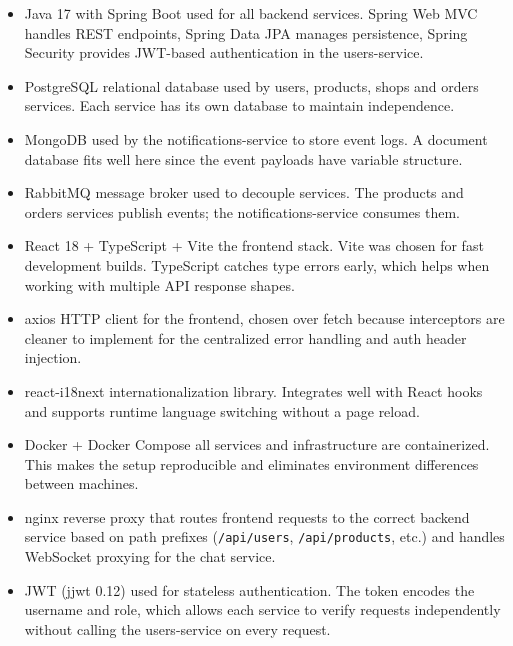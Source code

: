 \documentclass[12pt, a4paper]{article}
\begin{document}
\begin{itemize}
    \item Java 17 with Spring Boot  used for all backend services. Spring Web MVC handles
    REST endpoints, Spring Data JPA manages persistence, Spring Security provides JWT-based
    authentication in the users-service.

    \item PostgreSQL  relational database used by users, products, shops and orders services.
    Each service has its own database to maintain independence.

    \item MongoDB  used by the notifications-service to store event logs. A document database
    fits well here since the event payloads have variable structure.

    \item RabbitMQ  message broker used to decouple services. The products and orders services
    publish events; the notifications-service consumes them.

    \item React 18 + TypeScript + Vite  the frontend stack. Vite was chosen for fast
    development builds. TypeScript catches type errors early, which helps when working with
    multiple API response shapes.

    \item axios  HTTP client for the frontend, chosen over fetch because interceptors are
    cleaner to implement for the centralized error handling and auth header injection.

    \item react-i18next  internationalization library. Integrates well with React hooks and
    supports runtime language switching without a page reload.

    \item Docker + Docker Compose  all services and infrastructure are containerized. This
    makes the setup reproducible and eliminates environment differences between machines.

    \item nginx  reverse proxy that routes frontend requests to the correct backend service
    based on path prefixes (\texttt{/api/users}, \texttt{/api/products}, etc.) and handles
    WebSocket proxying for the chat service.

    \item JWT (jjwt 0.12)  used for stateless authentication. The token encodes the username
    and role, which allows each service to verify requests independently without calling the
    users-service on every request.
\end{itemize}
\end{document}
